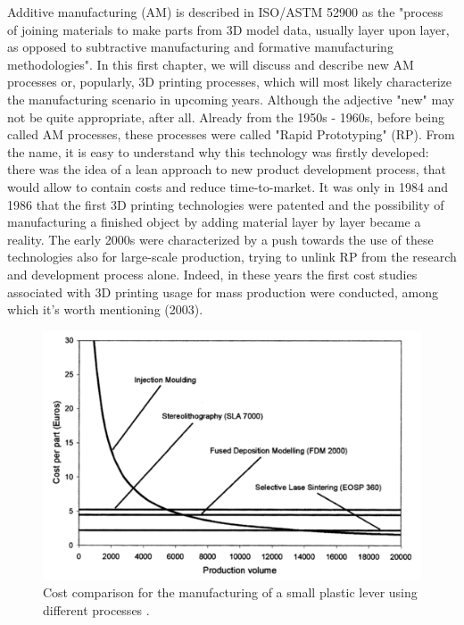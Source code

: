 Additive manufacturing (AM) is described in ISO/ASTM 52900 \cite{organization_isoastm_2015} as the "process of joining materials to make parts from 3D model data, usually layer upon layer, as opposed to subtractive manufacturing and formative manufacturing methodologies".
In this first chapter, we will discuss and describe new AM processes or, popularly, 3D printing processes, which will most likely characterize the manufacturing scenario in upcoming years. Although the adjective "new" may not be quite appropriate, after all. Already from the 1950s - 1960s, before being called AM processes, these processes were called "Rapid Prototyping" (RP). From the name, it is easy to understand why this technology was firstly developed: there was the idea of a lean approach to new product development process, that would allow to contain costs and reduce time-to-market. It was only in 1984 and 1986 that the first 3D printing technologies were patented and the possibility of manufacturing a finished object by adding material layer by layer became a reality. The early 2000s were characterized by a push towards the use of these technologies also for large-scale production, trying to unlink RP from the research and development process alone. Indeed, in these years the first cost studies associated with 3D printing usage for mass production were conducted, among which it's worth mentioning \citeauthor{hopkinson_analysis_2003} (2003). 
\begin{figure}[H]
    \centering
    \includegraphics[width=0.55 \textwidth]{Images/costs.png}
    \caption[Traditional processes vs AM costs.]{Cost comparison for the manufacturing of a small plastic lever using different processes \cite{hopkinson_analysis_2003}.}
    \label{fig:costs}
\end{figure}
